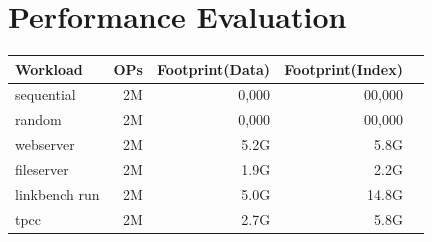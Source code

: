 \section{Performance Evaluation}

\begin{table}
    \centering
    \fontsize{11}{11}
    \begin{tabular}{| l | r | r | r | r | } %
    \hline
    \footnotesize{\textbf{Workload}} & \footnotesize{\textbf{OPs}} & \footnotesize{\textbf{Footprint(Data)}} & \footnotesize{\textbf{Footprint(Index)}} \\ \hline \hline
    \footnotesize{sequential} & \footnotesize{2M} & \footnotesize{0,000} & \footnotesize{00,000} \\ \hline
    \footnotesize{random} & \footnotesize{2M} & \footnotesize{0,000} & \footnotesize{00,000} \\ \hline
    \footnotesize{webserver} & \footnotesize{2M} & \footnotesize{5.2G} & \footnotesize{5.8G} \\ \hline
    \footnotesize{fileserver} & \footnotesize{2M} & \footnotesize{1.9G} & \footnotesize{2.2G} \\ \hline
    \footnotesize{linkbench run} & \footnotesize{2M} & \footnotesize{5.0G} & \footnotesize{14.8G} \\ \hline
    \footnotesize{tpcc} & \footnotesize{2M} & \footnotesize{2.7G} & \footnotesize{5.8G} \\ \hline

\end{tabular}
\end{table}
